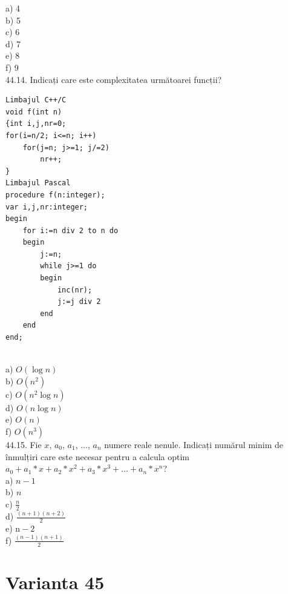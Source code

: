 \begin{itemize}
\begin{enumerate}
a) 4
\\
b) 5
\\
c) 6
\\
d) 7
\\
e) 8
\\
f) 9
\\
44.14. Indicați care este complexitatea următoarei funcții?
\begin{verbatim}
Limbajul C++/C
void f(int n)
{int i,j,nr=0;
for(i=n/2; i<=n; i++)
    for(j=n; j>=1; j/=2)
        nr++;
}
Limbajul Pascal
procedure f(n:integer);
var i,j,nr:integer;
begin
    for i:=n div 2 to n do
    begin
        j:=n;
        while j>=1 do
        begin
            inc(nr);
            j:=j div 2
        end
    end
end;
\end{verbatim}
\\
a) $O(\log n)$
\\
b) $O\left(n^{2}\right)$
\\
c) $O\left(n^{2} \log n\right)$
\\
d) $O(n \log n)$
\\
e) $O(n)$
\\
f) $O\left(n^{3}\right)$
\\
44.15. Fie $x$, $a_{0}$, $a_{1}$, $\ldots$, $a_{n}$ numere reale nenule. Indicați numărul minim de înmulțiri care este necesar pentru a calcula optim $a_{0}+a_{1}*x+a_{2}*x^{2}+a_{3}*x^{3}+\ldots+a_{n}*x^{n}$?
\\
a) $n-1$
\\
b) $n$
\\
c) $\frac{n}{2}$
\\
d) $\frac{(n+1)(n+2)}{2}$
\\
e) $\mathrm{n}-2$
\\
f) $\frac{(n-1)(n+1)}{2}$
\\

\section*{Varianta 45}


\end{enumerate}
\end{itemize}
